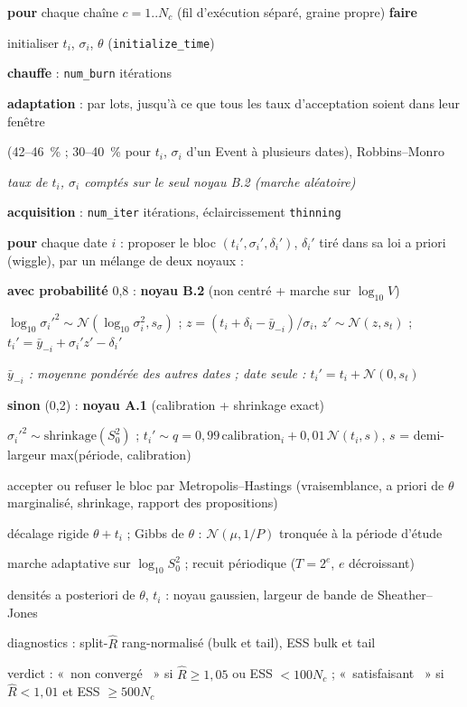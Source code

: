 \documentclass[11pt,a4paper]{article}
\providecommand{\og}{«~}\providecommand{\fg}{\unskip~»}
\newcommand{\code}[1]{\texttt{\small #1}}
\newcounter{algl}
\newlength{\algind}\setlength{\algind}{1.2em}
\newenvironment{algo}{%
  \begin{list}{\scriptsize\arabic{algl}}{\usecounter{algl}%
    \setlength{\itemsep}{0pt}\setlength{\parsep}{0pt}\setlength{\topsep}{2pt}%
    \setlength{\leftmargin}{2.2em}\setlength{\labelwidth}{1.6em}\small}}%
  {\end{list}}
\newcommand{\Li}[2]{\item\hspace*{#1\algind}#2}
\newcommand{\Kw}[1]{\textbf{#1}}
\newcommand{\Com}[1]{\hfill{\color{gray}\textit{\footnotesize #1}}}
\begin{document}
\begin{algorithme}[htbp]
\caption{Échantillonnage d'un Event (\code{EventMcmc}, d'après \code{MCMCLoopChrono})}\label{alg:mcmc}
\begin{algo}
\Li0{\Kw{pour} chaque chaîne $c = 1..N_c$ (fil d'exécution séparé, graine propre) \Kw{faire}}
\Li1{initialiser $t_i$, $\sigma_i$, $\theta$ (\code{initialize\_time})}
\Li1{\Kw{chauffe} : \code{num\_burn} itérations}
\Li1{\Kw{adaptation} : par lots, jusqu'à ce que tous les taux d'acceptation soient dans leur fenêtre}
\Li2{(42--46~\% ; 30--40~\% pour $t_i$, $\sigma_i$ d'un Event à plusieurs dates), Robbins--Monro}
\Li2{\Com{taux de $t_i$, $\sigma_i$ comptés sur le seul noyau B.2 (marche aléatoire)}}
\Li1{\Kw{acquisition} : \code{num\_iter} itérations, éclaircissement \code{thinning}}
\Li2{\Kw{pour} chaque date $i$ : proposer le bloc $(t_i', \sigma_i', \delta_i')$, $\delta_i'$ tiré dans sa loi
  a priori (wiggle), par un mélange de deux noyaux :}
\Li3{\Kw{avec probabilité} 0,8 : \Kw{noyau B.2} (non centré + marche sur $\log_{10} V$)}
\Li4{$\log_{10}\sigma_i'^2 \sim \mathcal N(\log_{10}\sigma_i^2, s_\sigma)$ ;
  $z = (t_i+\delta_i-\bar y_{-i})/\sigma_i$, $z' \sim \mathcal N(z, s_t)$ ;
  $t_i' = \bar y_{-i} + \sigma_i' z' - \delta_i'$}
\Li4{\Com{$\bar y_{-i}$ : moyenne pondérée des autres dates ; date seule : $t_i' = t_i + \mathcal N(0, s_t)$}}
\Li3{\Kw{sinon} (0,2) : \Kw{noyau A.1} (calibration + shrinkage exact)}
\Li4{$\sigma_i'^2 \sim \text{shrinkage}(S_0^2)$ ; $t_i' \sim q = 0{,}99\,\text{calibration}_i + 0{,}01\,
  \mathcal N(t_i, s)$, $s$ = demi-largeur max(période, calibration)}
\Li3{accepter ou refuser le bloc par Metropolis--Hastings (vraisemblance, a priori de $\theta$ marginalisé, shrinkage,
  rapport des propositions)}
\Li2{décalage rigide $\theta + t_i$ ; Gibbs de $\theta$ : $\mathcal N(\mu, 1/P)$ tronquée à la période d'étude}
\Li2{marche adaptative sur $\log_{10} S_0^2$ ; recuit périodique ($T = 2^e$, $e$ décroissant)}
\Li0{densités a posteriori de $\theta$, $t_i$ : noyau gaussien, largeur de bande de Sheather--Jones}
\Li0{diagnostics : split-$\hat R$ rang-normalisé (bulk et tail), ESS bulk et tail}
\Li0{verdict : \og non convergé \fg{} si $\hat R \ge 1{,}05$ ou ESS $< 100 N_c$ ; \og satisfaisant \fg{} si
  $\hat R < 1{,}01$ et ESS $\ge 500 N_c$}
\end{algo}
\end{algorithme}
\end{document}
